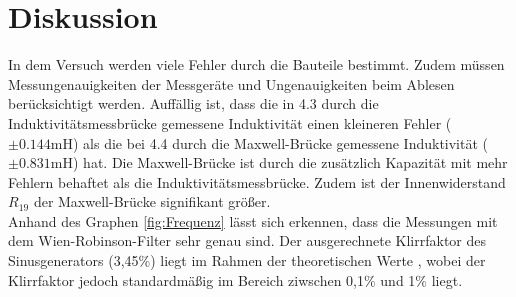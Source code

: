 \section{Diskussion}

In dem Versuch werden viele Fehler durch die Bauteile bestimmt. Zudem müssen Messungenauigkeiten der Messgeräte und Ungenauigkeiten beim Ablesen berücksichtigt werden.
Auffällig ist, dass die in 4.3 durch die Induktivitätsmessbrücke gemessene Induktivität einen kleineren Fehler ($\pm 0.144 \text{mH}$) als die bei 4.4 durch die Maxwell-Brücke gemessene Induktivität ($\pm 0.831 \text{mH}$) hat. Die Maxwell-Brücke ist durch die zusätzlich Kapazität mit mehr Fehlern behaftet als die Induktivitätsmessbrücke. Zudem ist der Innenwiderstand $R_{19}$ der Maxwell-Brücke signifikant größer.
\\
Anhand des Graphen \ref{fig:Frequenz} lässt sich erkennen, dass die Messungen mit dem Wien-Robinson-Filter sehr genau sind.  
Der ausgerechnete Klirrfaktor des Sinusgenerators (3,45$\%$) liegt im Rahmen der theoretischen Werte \cite{2}, wobei der Klirrfaktor jedoch standardmäßig im Bereich ziwschen 0,1$\%$ und 1$\%$ liegt.
